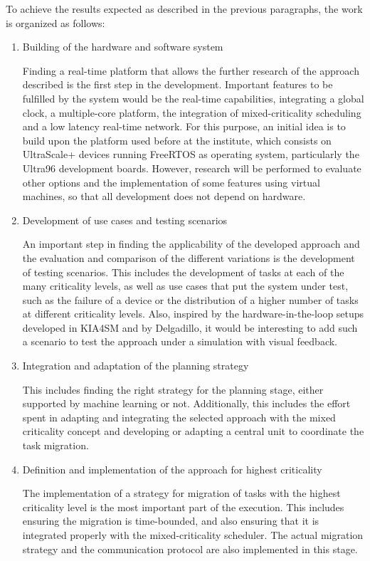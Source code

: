 To achieve the results expected as described in the previous paragraphs, the work is organized as follows:

\begin{enumerate}
	\item	Building of the hardware and software system
	
	Finding a real-time platform that allows the further research of the approach described is the first step in the development. Important features to be fulfilled by the system would be the real-time capabilities, integrating a global clock, a multiple-core platform, the integration of mixed-criticality scheduling and a low latency real-time network. For this purpose, an initial idea is to build upon the platform used before at the institute, which consists on UltraScale+ devices running FreeRTOS as operating system, particularly the Ultra96 development boards. However, research will be performed to evaluate other options and the implementation of some features using virtual machines, so that all development does not depend on hardware.
	
	\item	Development of use cases and testing scenarios
	
	An important step in finding the applicability of the developed approach and the evaluation and comparison of the different variations is the development of testing scenarios. This includes the development of tasks at each of the many criticality levels, as well as use cases that put the system under test, such as the failure of a device or the distribution of a higher number of tasks at different criticality levels. Also, inspired by the hardware-in-the-loop setups developed in KIA4SM and by Delgadillo, it would be interesting to add such a scenario to test the approach under a simulation with visual feedback.
	
	\item	Integration and adaptation of the planning strategy
	
	This includes finding the right strategy for the planning stage, either supported by machine learning or not. Additionally, this includes the effort spent in adapting and integrating the selected approach with the mixed criticality concept and developing or adapting a central unit to coordinate the task migration.
	
	\item	Definition and implementation of the approach for highest criticality
	
	The implementation of a strategy for migration of tasks with the highest criticality level is the most important part of the execution. This includes ensuring the migration is time-bounded, and also ensuring that it is integrated properly with the mixed-criticality scheduler. The actual migration strategy and the communication protocol are also implemented in this stage.
	

\end{enumerate}
